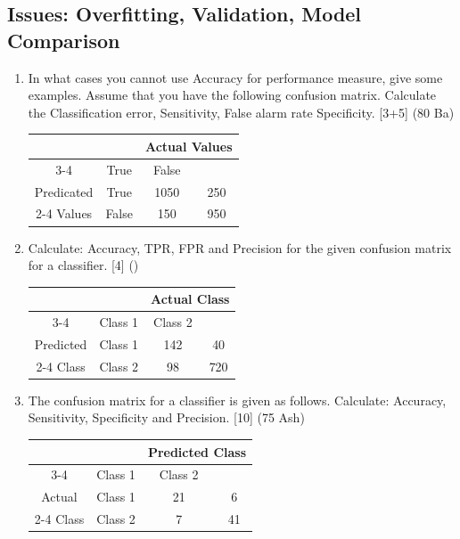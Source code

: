 \documentclass[12pt]{article}
\begin{document}
  \subsection{Issues: Overfitting, Validation, Model Comparison}
    \begin{enumerate}[topsep=0pt, noitemsep]
      \item In what cases you cannot use Accuracy for performance measure, give some examples. Assume that you have the following confusion matrix. Calculate the Classification error, Sensitivity, False alarm rate Specificity. \hfill [3+5] (80 Ba)\\
        \small
        \begin{tabular}{|c|c|c|c|}
          \hline
          \multicolumn{2}{|c|}{} & \multicolumn{2}{c|}{Actual Values} \\ \cline{3-4}
          \multicolumn{2}{|c|}{} & True & False \\ \hline
          Predicated & True & 1050 & 250 \\ \cline{2-4}
          Values & False & 150 & 950 \\ \hline
        \end{tabular}
        \normalsize

      \item Calculate: Accuracy, TPR, FPR and Precision for the given confusion matrix for a classifier. \hfill [4] ()\\
        \small
        \begin{tabular}{|c|c|c|c|}
          \hline
          \multicolumn{2}{|c|}{} & \multicolumn{2}{c|}{Actual Class} \\ \cline{3-4}
          \multicolumn{2}{|c|}{} & Class 1 & Class 2 \\ \hline
          Predicted & Class 1 & 142 & 40 \\ \cline{2-4}
          Class & Class 2 & 98 & 720 \\ \hline
        \end{tabular}
        \normalsize

      \item The confusion matrix for a classifier is given as follows. Calculate: Accuracy, Sensitivity, Specificity and Precision. \hfill [10] (75 Ash)\\
        \small
        \begin{tabular}{|c|c|c|c|}
          \hline
          \multicolumn{2}{|c|}{} & \multicolumn{2}{c|}{Predicted Class} \\ \cline{3-4}
          \multicolumn{2}{|c|}{} & Class 1 & Class 2 \\ \hline
          Actual & Class 1 & 21 & 6 \\ \cline{2-4}
          Class & Class 2 & 7 & 41 \\ \hline
        \end{tabular}
        \normalsize


\end{enumerate}
\end{document}
